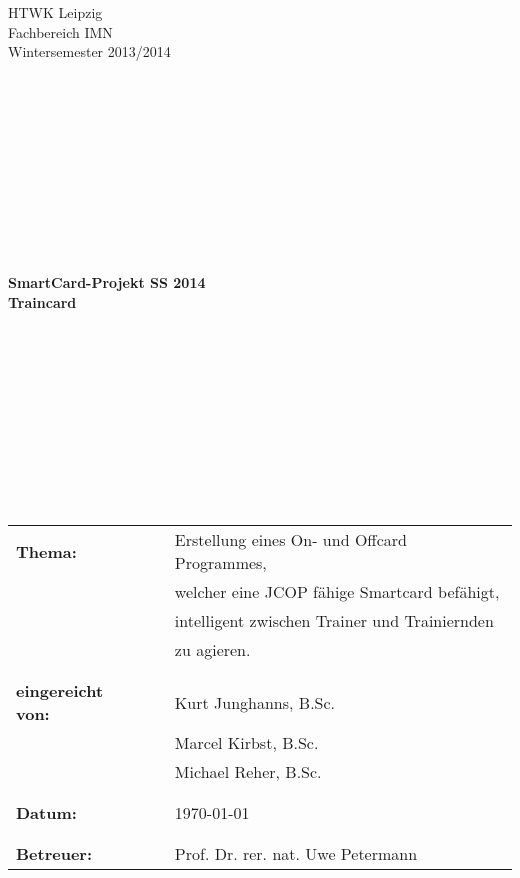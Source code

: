 \documentclass[a4paper,12pt]{article}
\begin{document}
 
\begin{titlepage}

\begin{small}
\begin{flushleft}
\vfill {
HTWK Leipzig\\
Fachbereich IMN \\
Wintersemester 2013/2014}
\end{flushleft}
\end{small}
 \begin{verbatim}












\end{verbatim}
\begin{center}
\begin{Large}
\textsf{\textbf{
SmartCard-Projekt SS 2014\\
Traincard\\
}}
\end{Large}
\end{center}
\begin{verbatim}












\end{verbatim}
\begin{flushleft}
\begin{tabular}{lll}
\textbf{Thema:} & & Erstellung eines On- und Offcard Programmes,\\
& & welcher eine JCOP fähige Smartcard befähigt,\\
& & intelligent zwischen Trainer und Trainiernden\\
& & zu agieren.\\
& & \\
& & \\
\textbf{eingereicht von:} & & Kurt Junghanns, B.Sc.\\
& & Marcel Kirbst, B.Sc.\\
& & Michael Reher, B.Sc.\\
& & \\
& & \\
\textbf{Datum:} & & \today\\
& & \\
& & \\
\textbf{Betreuer:} & & Prof. Dr. rer. nat. Uwe Petermann\\
\end{tabular}
\end{flushleft} 

\end{titlepage}
\end{document}
